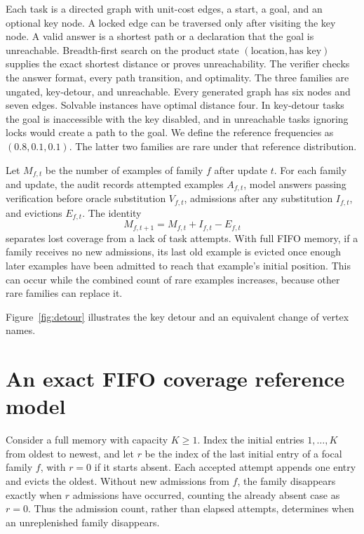 \documentclass[11pt]{article}
\begin{document}
Each task is a directed graph with unit-cost edges, a start, a goal, and
an optional key node. A locked edge can be traversed only after visiting
the key node. A valid answer is a shortest path or a declaration that
the goal is unreachable. Breadth-first search on the product state
$(\text{location},\text{has key})$ supplies the exact shortest distance
or proves unreachability. The verifier checks the answer format, every
path transition, and optimality. The three families are ungated,
key-detour, and unreachable. Every generated graph has six nodes and
seven edges. Solvable instances have optimal distance four. In
key-detour tasks the goal is inaccessible with the key disabled, and in
unreachable tasks ignoring locks would create a path to the goal.
We define the reference frequencies as $(0.8,0.1,0.1)$. The latter two
families are rare under that reference distribution.

Let $M_{f,t}$ be the number of examples of family $f$ after update $t$.
For each family and update, the audit records attempted examples
$A_{f,t}$, model answers passing verification before oracle substitution
$V_{f,t}$,
admissions after any substitution $I_{f,t}$,
and evictions $E_{f,t}$. The identity
\[
 M_{f,t+1} = M_{f,t} + I_{f,t} - E_{f,t}
\]
separates lost coverage from a lack of task attempts. With full FIFO
memory, if a family receives no new admissions, its last old example is
evicted once enough later examples have been admitted to reach that
example's initial position. This can occur while the combined count of
rare examples increases, because other rare families can replace it.

Figure~\ref{fig:detour} illustrates the key detour and an equivalent
change of vertex names.



\section{An exact FIFO coverage reference model}

Consider a full memory with capacity $K\ge 1$. Index the initial
entries $1,\dots,K$ from oldest to newest, and let $r$ be the index of
the last initial entry of a focal family $f$, with $r=0$ if it starts
absent. Each
accepted attempt appends one entry and evicts the oldest. Without new
admissions from $f$, the family disappears exactly when $r$ admissions
have occurred, counting the already absent case as $r=0$. Thus the
admission count, rather than elapsed attempts, determines when an
unreplenished family disappears.
\end{document}
